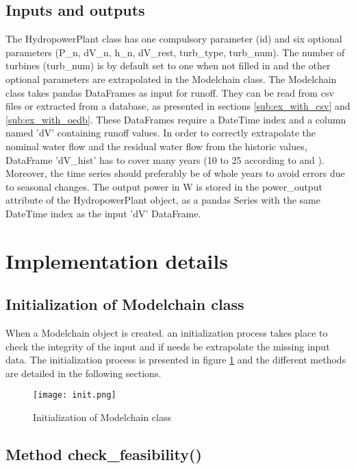 \subsection{Inputs and outputs}

The HydropowerPlant class has one compulsory parameter (id) and six optional parameters (P{\_}n, dV{\_}n, h{\_}n, dV{\_}rest, turb{\_}type, turb{\_}num). The number of turbines (turb{\_}num) is by default set to one when not filled in and the other optional parameters are extrapolated in the Modelchain class. \newline 
The Modelchain class takes pandas DataFrames as input for runoff. They can be read from csv files or extracted from a database, as presented in sections \ref{sub:ex_with_csv} and \ref{sub:ex_with_oedb}. These DataFrames require a DateTime index and a column named 'dV' containing runoff values. In order to correctly extrapolate the nominal water flow and the residual water flow from the historic values, DataFrame 'dV{\_}hist' has to cover many years (10 to 25 according to \cite{pacer} and \cite{cetmef}). Moreover, the time series should preferably be of whole years to avoid errors due to seasonal changes. \newline
The output power in \unit{W} is stored in the power{\_}output attribute of the HydropowerPlant object, as a pandas Series with the same DateTime index as the input 'dV' DataFrame.

\section{Implementation details}

\subsection{Initialization of Modelchain class}

When a Modelchain object is created. an initialization process takes place to check the integrity of the input and if needs be extrapolate the missing input data. The initialization process is presented in figure \ref{init} and the different methods are detailed in the following sections.

\begin{figure}[H]
\centering
\texttt{[image: init.png]}
\caption{Initialization of Modelchain class}
\label{init}
\end{figure}

\subsection{Method check{\_}feasibility()}
\label{sub:check_feas}

